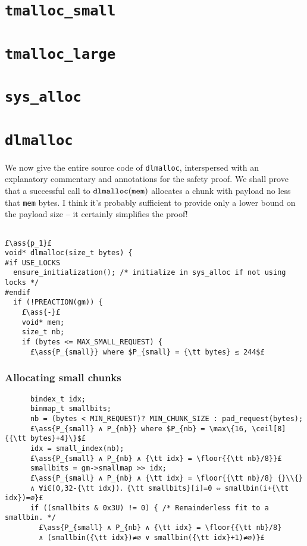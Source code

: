 \documentclass[10pt,a4paper,twoside]{report}
\makeatletter
\newcommand{\ml}[2][t]{\mbox{\mdseries\begin{tabular}[#1]{@{}L@{}}#2\end{tabular}}}
\newcommand{\ass}[1]{\ensuremath{{\color{blue}\left\{\ml[c]{#1}\right\}}}}
\renewcommand{\floor}[2][]{\left\lfloor{#2}\right\rfloor_{#1}}
\renewcommand{\ceil}[2][]{\left\lceil{#2}\right\rceil_{#1}}
\makeatother
\begin{document}
\chapter{{\tt tmalloc\_small}}\label{chap:tmalloc_small}

\chapter{{\tt tmalloc\_large}}\label{chap:tmalloc_large}

\chapter{{\tt sys\_alloc}}\label{chap:sys_alloc}


\chapter{{\tt dlmalloc}}

We now give the entire source code of {\tt dlmalloc}, interspersed with an explanatory commentary and annotations for the safety proof. We shall prove that a successful call to ${\tt dlmalloc}({\tt mem})$ allocates a chunk with payload no less that {\tt mem} bytes. I think it's probably sufficient to provide only a lower bound on the payload size -- it certainly simplifies the proof!

\setcounter{lstnumber}{0}
\begin{lstlisting}

£\ass{p_1}£
void* dlmalloc(size_t bytes) {
#if USE_LOCKS
  ensure_initialization(); /* initialize in sys_alloc if not using locks */
#endif
  if (!PREACTION(gm)) {
    £\ass{-}£
    void* mem;
    size_t nb;
    if (bytes <= MAX_SMALL_REQUEST) {
      £\ass{P_{small}} where $P_{small} = {\tt bytes} ≤ 244$£
\end{lstlisting}

\subsection*{Allocating small chunks}\label{sect:allocating_small_chunks}
\begin{lstlisting}
      bindex_t idx;
      binmap_t smallbits;
      nb = (bytes < MIN_REQUEST)? MIN_CHUNK_SIZE : pad_request(bytes);
      £\ass{P_{small} ∧ P_{nb}} where $P_{nb} = \max\{16, \ceil[8]{{\tt bytes}+4}\}$£
      idx = small_index(nb);
      £\ass{P_{small} ∧ P_{nb} ∧ {\tt idx} = \floor{{\tt nb}/8}}£
      smallbits = gm->smallmap >> idx;
      £\ass{P_{small} ∧ P_{nb} ∧ {\tt idx} = \floor{{\tt nb}/8} {}\\{}
      ∧ ∀i∈[0,32-{\tt idx})．{\tt smallbits}[i]=0 ⇔ smallbin(i+{\tt idx})=∅}£
      if ((smallbits & 0x3U) != 0) { /* Remainderless fit to a smallbin. */
        £\ass{P_{small} ∧ P_{nb} ∧ {\tt idx} = \floor{{\tt nb}/8}
        ∧ (smallbin({\tt idx})≠∅ ∨ smallbin({\tt idx}+1)≠∅)}£
\end{lstlisting}
\end{document}

